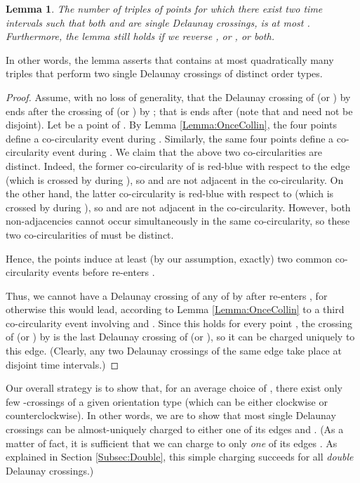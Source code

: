 \documentclass[letter,11pt]{article}
\newtheorem{lemma}[theorem]{Lemma}
\begin{document}
\begin{lemma}\label{Lemma:TwiceCollin}
The number of triples of points  for which there exist two time intervals  such that both  and  are single Delaunay crossings, is at most . Furthermore, the lemma still holds if we reverse 
, or , or both. 
\end{lemma}

In other words, the lemma asserts that  contains at most quadratically many triples  that perform two single Delaunay crossings of distinct order types.

\begin{proof}
Assume, with no loss of generality, that the Delaunay crossing of  (or ) by  ends after the crossing of  (or ) by ; that is  ends after  (note that  and  need not be disjoint).
Let  be a point of .
By Lemma \ref{Lemma:OnceCollin}, the four points  define a co-circularity event during .
Similarly, the same four points  define a co-circularity event during . We claim that the above two co-circularities are distinct. 
Indeed, the former co-circularity of  is red-blue with respect to the edge  (which is crossed by  during ), so  and  are not adjacent in the co-circularity. On the other hand, the latter co-circularity is red-blue with respect to  (which is crossed by  during ), so  and  are not adjacent in the co-circularity. However, both non-adjacencies cannot occur simultaneously in the same co-circularity, so these two co-circularities of  must be distinct.


Hence, the points 
induce at least (by our assumption, exactly) two common co-circularity events before  re-enters . 

Thus, we cannot have a Delaunay crossing of any of  by  after  re-enters , for otherwise this would lead, according to Lemma \ref{Lemma:OnceCollin} to a third co-circularity event involving  and . 
Since this holds for every point , the crossing of  (or ) by  is the last Delaunay crossing of  (or ), so it can be charged uniquely to this edge. (Clearly, any two Delaunay crossings of the same edge  take place at disjoint time intervals.)
\end{proof}






\smallskip

Our overall strategy is to show that, for an average choice of , there exist only few -crossings of a given orientation type (which can be either clockwise or counterclockwise).
In other words, we are to show that most single Delaunay crossings  can be almost-uniquely charged to either one of its edges  and . (As a matter of fact, it is sufficient that we can charge  to only {\it one} of its edges . As explained in Section \ref{Subsec:Double}, this simple charging succeeds for all {\it double} Delaunay crossings.)
\end{document}
